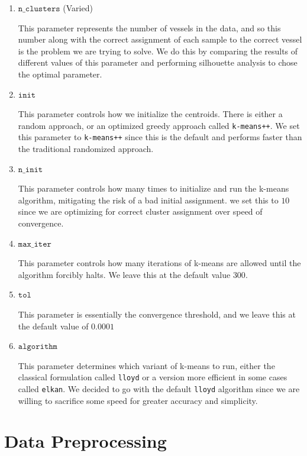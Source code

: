 \documentclass[12pt]{fphw}
\begin{document}
\begin{enumerate}
    \item $\texttt{n\_clusters}$ (Varied)
    
    This parameter represents the number of vessels in the data, and so this number along with the correct assignment of each
    sample to the correct vessel is the problem we are trying to solve. We do this by comparing the results of different values of this
    parameter and performing silhouette analysis to chose the optimal parameter.

    \item $\texttt{init}$
    
    This parameter controls how we initialize the centroids. There is either a random approach, or an optimized greedy approach called \texttt{k-means++}.
    We set this parameter to \texttt{k-means++} since this is the default and performs faster than the traditional randomized approach.

    \item $\texttt{n\_init}$
    
    This parameter controls how many times to initialize and run the k-means algorithm, mitigating the risk of a bad initial assignment. we set this to $10$ since we are
    optimizing for correct cluster assignment over speed of convergence.

    \item $\texttt{max\_iter}$
    
    This parameter controls how many iterations of k-means are allowed until the algorithm forcibly halts. We leave this at the default value $300$.

    \item $\texttt{tol}$
    
    This parameter is essentially the convergence threshold, and we leave this at the default value of $0.0001$

    \item $\texttt{algorithm}$
    
    This parameter determines which variant of k-means to run, either the classical formulation called \texttt{lloyd} or a version more efficient in
    some cases called \texttt{elkan}. We decided to go with the default \texttt{lloyd} algorithm since we are
    willing to sacrifice some speed for greater accuracy and simplicity.
\end{enumerate}

\section*{Data Preprocessing}
\end{document}
